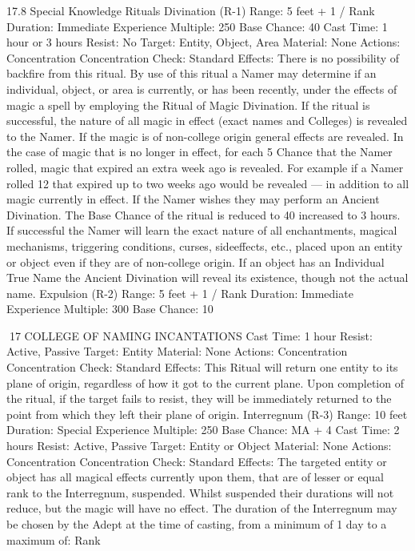 \documentclass[a4paper]{article}
\begin{document}
\begin{multicols}{3}
17.8 Special Knowledge Rituals
Divination (R-1)
Range: 5 feet + 1 / Rank
Duration: Immediate
Experience Multiple: 250
Base Chance: 40%
Cast Time: 1 hour or 3 hours
Resist: No
Target: Entity, Object, Area
Material: None
Actions: Concentration
Concentration Check: Standard
Effects: There is no possibility of backfire from
this ritual. By use of this ritual a Namer may determine if an individual, object, or area is currently,
or has been recently, under the effects of magic a
spell by employing the Ritual of Magic Divination.
If the ritual is successful, the nature of all magic in
effect (exact names and Colleges) is revealed to the
Namer. If the magic is of non-college origin general effects are revealed. In the case of magic that
is no longer in effect, for each 5%
Chance that the Namer rolled, magic that expired
an extra week ago is revealed. For example if a
Namer rolled 12%
that expired up to two weeks ago would be revealed — in addition to all magic currently in
effect.
If the Namer wishes they may perform an Ancient
Divination. The Base Chance of the ritual is reduced to 40%
increased to 3 hours. If successful the Namer will
learn the exact nature of all enchantments, magical
mechanisms, triggering conditions, curses, sideeffects, etc., placed upon an entity or object even if
they are of non-college origin. If an object has an
Individual True Name the Ancient Divination will
reveal its existence, though not the actual name.
Expulsion (R-2)
Range: 5 feet + 1 / Rank
Duration: Immediate
Experience Multiple: 300
Base Chance: 10%

17 COLLEGE OF NAMING INCANTATIONS
Cast Time: 1 hour
Resist: Active, Passive
Target: Entity
Material: None
Actions: Concentration
Concentration Check: Standard
Effects: This Ritual will return one entity to its
plane of origin, regardless of how it got to the
current plane. Upon completion of the ritual, if the
target fails to resist, they will be immediately returned to the point from which they left their plane
of origin.
Interregnum (R-3)
Range: 10 feet
Duration: Special
Experience Multiple: 250
Base Chance: MA + 4%
Cast Time: 2 hours
Resist: Active, Passive
Target: Entity or Object
Material: None
Actions: Concentration
Concentration Check: Standard
Effects: The targeted entity or object has all magical effects currently upon them, that are of lesser or
equal rank to the Interregnum, suspended. Whilst
suspended their durations will not reduce, but the
magic will have no effect. The duration of the
Interregnum may be chosen by the Adept at the
time of casting, from a minimum of 1 day to a
maximum of:
Rank


\end{multicols}
\end{document}

